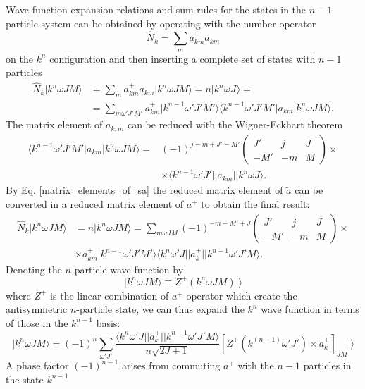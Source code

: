 \documentclass[
12pt, %
oneside, %
english, %
onehalfspacing, %
onehalfspacing, %
headsepline, %
]{MastersDoctoralThesis} %
\begin{document}
Wave-function expansion relations and sum-rules for the states in the $n-1$ particle system can be obtained by operating with the number operator
\begin{equation}
\hat{N}_k=\sum_m {a}^{+}_{km} {a}_{km}
\end{equation}
on the $k^n$ configuration and then inserting a complete set of states with $n-1$ particles
\begin{align}
\hat{N}_k \vert  k^{n} \omega J M   \rangle   
  &=\sum_m {a}^{+}_{km} {a}_{km} \vert  k^{n} \omega  J M \rangle
   =   n \vert  k^{n} \omega^{} J^{}   \rangle =  \nonumber \\
  &=
  \sum_{m\omega' J' M'}  {a}^{+}_{km} 
  \vert k^{n-1} \omega' J' M' \rangle
  \langle k^{n-1} \omega' J' M'  \vert
  {a}_{km} \vert k^{n} \omega J M \rangle.
\end{align}
The matrix element of $a_{k,m}$ can be reduced with the Wigner-Eckhart theorem
\begin{align}
 \langle k^{n-1} \omega' J' M'  \vert
  {a}_{km} \vert k^{n} \omega J M \rangle = &
  (-1)^{j-m+J'-M'} 
  \begin{pmatrix}
  J' & j & J \\ 
  -M' & -m & M
  \end{pmatrix} \times \nonumber \\
  & \times
  \langle k^{n-1} \omega' J' \vert \vert
  {a}_{km} \vert  \vert k^{n} \omega J  \rangle.
\end{align}
By Eq. \ref{matrix_elements_of_sa} the reduced matrix element of $\tilde{a}$ can be converted in a reduced matrix element of $a^+$ to obtain the final result:
\begin{align}
\hat{N}_k \vert  k^{n} \omega J M   \rangle   &= n \vert  k^{n} \omega J M   \rangle = 
\sum_{m\omega J M} (-1)^{-m-M'+J} 
\begin{pmatrix}
  J' & j & J \\ 
  -M' & -m & M
  \end{pmatrix} \times \nonumber \\
  & \times 
   {a}^{+}_{km} 
  \vert k^{n-1} \omega' J' M' \rangle
  \langle k^{n} \omega' J   \vert \vert
  {a}_{k}^+ 
  \vert \vert
   k^{n-1} \omega' J' M \rangle.
   \label{knmo_basis}
\end{align}
Denoting the $n$-particle wave function by
\begin{equation}
\vert k^n \omega J M \rangle \equiv Z^+ (k^n \omega J M ) \vert	 \rangle
\end{equation}
where $Z^+$ is the linear combination of $a^+$ operator which create the antisymmetric $n$-particle state,
we can thus expand the $k^n$ wave function in terms of those in the $k^{n-1}$ basis:
\begin{equation}
\vert  k^{n} \omega J M   \rangle = 
(-1)^n \sum_{\omega'J'} 
\frac{\langle k^{n} \omega' J   \vert \vert
  {a}_{k}^+ 
  \vert \vert
   k^{n-1} \omega' J' M \rangle }{n\sqrt{2J+1}}
   \left[ Z^+ (k^{(n-1)} \omega' J') \times a^+_k \right]_{JM} \vert \rangle
\end{equation}
A phase factor $(-1)^{n-1}$ arises from commuting $a^+$ with the $n-1$ particles in the state $k^{n-1}$
\end{document}
